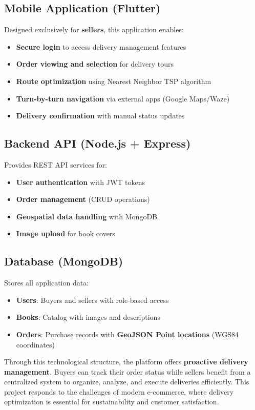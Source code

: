 \documentclass[12pt,a4paper]{article}
\begin{document}
\subsection{Mobile Application (Flutter)}

Designed exclusively for \textbf{sellers}, this application enables:
\begin{itemize}
    \item \textbf{Secure login} to access delivery management features
    \item \textbf{Order viewing and selection} for delivery tours
    \item \textbf{Route optimization} using Nearest Neighbor TSP algorithm
    \item \textbf{Turn-by-turn navigation} via external apps (Google Maps/Waze)
    \item \textbf{Delivery confirmation} with manual status updates
\end{itemize}

\subsection{Backend API (Node.js + Express)}

Provides REST API services for:
\begin{itemize}
    \item \textbf{User authentication} with JWT tokens
    \item \textbf{Order management} (CRUD operations)
    \item \textbf{Geospatial data handling} with MongoDB
    \item \textbf{Image upload} for book covers
\end{itemize}

\subsection{Database (MongoDB)}

Stores all application data:
\begin{itemize}
    \item \textbf{Users}: Buyers and sellers with role-based access
    \item \textbf{Books}: Catalog with images and descriptions
    \item \textbf{Orders}: Purchase records with \textbf{GeoJSON Point locations} (WGS84 coordinates)
\end{itemize}

Through this technological structure, the platform offers \textbf{proactive delivery management}. Buyers can track their order status while sellers benefit from a centralized system to organize, analyze, and execute deliveries efficiently. This project responds to the challenges of modern e-commerce, where delivery optimization is essential for sustainability and customer satisfaction.
\end{document}

